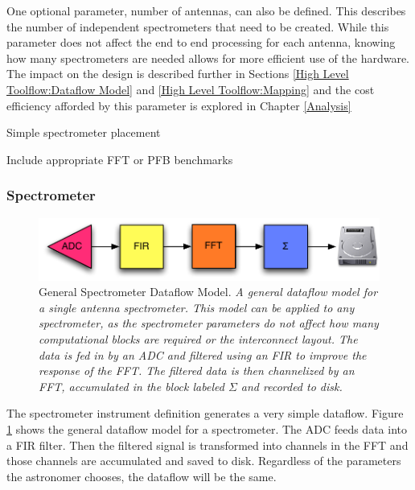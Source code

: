 One optional parameter, number of antennas, can also be defined. 
This describes the number of independent spectrometers that need to be created.
While this parameter does not affect the end to end processing for each antenna, knowing how many spectrometers are needed allows for more efficient use of the hardware.
The impact on the design is described further in Sections \ref{High Level Toolflow:Dataflow Model} and \ref{High Level Toolflow:Mapping} and the cost efficiency afforded by this parameter is explored in Chapter \ref{Analysis}

Simple spectrometer placement

Include appropriate FFT or PFB benchmarks

\subsubsection{Spectrometer}

\begin{figure}[ht!]
  \centering
    \includegraphics[width=1\textwidth]{Images/C4/spectrometer_dataflow.pdf}
  \caption[General Spectrometer Dataflow Model]{General Spectrometer Dataflow Model.
  \textit{
  A general dataflow model for a single antenna spectrometer. 
  This model can be applied to any spectrometer, as the spectrometer parameters do not affect how many computational blocks are required or the interconnect layout. 
  The data is fed in by an ADC and filtered using an FIR to improve the response of the FFT.
  The filtered data is then channelized by an FFT, accumulated in the block labeled $\Sigma$ and recorded to disk.
  }}
  \label{fig: C4/spectrometer_dataflow.pdf}
\end{figure}

The spectrometer instrument definition generates a very simple dataflow. 
Figure \ref{fig: C4/spectrometer_dataflow.pdf} shows the general dataflow model for a spectrometer. 
The ADC feeds data into a FIR filter. 
Then the filtered signal is transformed into channels in the FFT and those channels are accumulated and saved to disk. Regardless of the parameters the astronomer chooses, the dataflow will be the same. 


